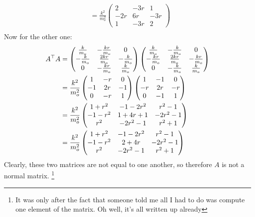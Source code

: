 \documentclass{article}
\begin{document}
\begin{solution}
\begin{align*}
&= \frac{k^2}{m_o^2}\begin{pmatrix} 2 & -3r & 1 \\ -2r & 6r & -3r\\1 & -3r & 2 \end{pmatrix}  \\
	\end{align*}
	Now for the other one:
	\begin{align*}
		A^\top A &=\begin{pmatrix}  \frac{k}{m_o} & -\frac{kr}{m_o} & 0\\ -\frac{k}{m_o} & \frac{2kr}{m_o} & -\frac{k}{m_o}\\ 0 & -\frac{kr}{m_o} & \frac{k}{m_o } \end{pmatrix} \begin{pmatrix}  \frac{k}{m_o} & -\frac{k}{m_o} & 0\\ -\frac{kr}{m_o} & \frac{2kr}{m_o} & -\frac{kr}{m_o}\\ 0 & -\frac{k}{m_o} & \frac{k}{m_o} \end{pmatrix} 
\\
&= \frac{k^2}{m_o^2}\begin{pmatrix}1 & -r & 0\\ -1 & 2r & -1\\0 & -r & 1  \end{pmatrix} \begin{pmatrix} 1 & -1 & 0\\-r & 2r & -r\\0& -1 & 1 \end{pmatrix}   \\
&= \frac{k^2}{m_o^2}\begin{pmatrix} 1 + r^2 & -1 - 2r^2 & r^2 - 1\\ -1 - r^2 & 1 + 4r + 1 & -2r^2 -1\\
r^2 & -2r^2 - 1 & r^2 + 1\end{pmatrix}  \\
&= \frac{k^2}{m_o^2} \begin{pmatrix} 1 + r^2 & -1 - 2r^2 & r^2 - 1\\ -1 - r^2 &2 + 4r & -2r^2 -1\\
r^2 & -2r^2 - 1 & r^2 + 1\end{pmatrix}
	\end{align*}
	Clearly, these two matrices are not equal to one another, so therefore $A$ is not a normal matrix.
	\footnote{It was only after the fact that someone told me all I had to do was compute one element of the 
	matrix. Oh well, it's all written up already}
\end{solution}
\end{document}
